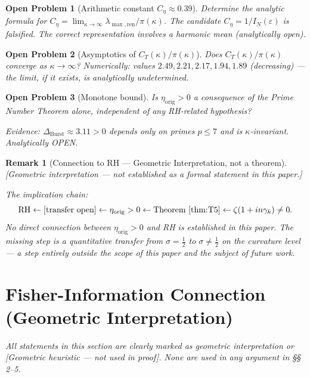 \documentclass[11pt]{article}
\newtheorem*{remark}{Remark}
\newtheorem*{openproblem}{Open Problem}
\newcommand{\etaorig}{\eta_{\mathrm{orig}}}
\newcommand{\Ceta}{C_{\eta}}
\newcommand{\CT}{C_{T}}
\newcommand{\Dburstvar}{\Delta_{\mathrm{Burst}}}
\begin{document}
\begin{openproblem}[Arithmetic constant $\Ceta\approx 0.39$]
Determine the analytic formula for
$\Ceta = \lim_{\kappa\to\infty}\lambda_{\max,\mathrm{ren}}/\pi(\kappa)$.
The candidate $\Ceta = 1/I_N(\varepsilon)$ is falsified.
The correct representation involves a harmonic mean
(analytically open).
\end{openproblem}

\begin{openproblem}[Asymptotics of $\CT(\kappa)/\pi(\kappa)$]
Does $\CT(\kappa)/\pi(\kappa)$ converge as $\kappa\to\infty$?
Numerically: values $2.49, 2.21, 2.17, 1.94, 1.89$ (decreasing) ---
the limit, if it exists, is analytically undetermined.
\end{openproblem}

\begin{openproblem}[Monotone bound]
Is $\etaorig > 0$ a consequence of the Prime Number Theorem alone,
independent of any RH-related hypothesis?

Evidence: $\Dburstvar\approx 3.11 > 0$ depends only on primes
$p\leq 7$ and is $\kappa$-invariant.
Analytically OPEN.
\end{openproblem}

\begin{remark}[Connection to RH --- Geometric Interpretation, not a theorem]
\emph{[Geometric interpretation --- not established as a formal
statement in this paper.]}

The implication chain:
\[
\mathrm{RH} \leftarrow
[\text{transfer open}]
\leftarrow \etaorig > 0
\leftarrow \text{Theorem~\ref{thm:T5}}
\leftarrow \zeta(1+in\gamma_k)\neq 0.
\]
No direct connection between $\etaorig > 0$ and RH is established
in this paper. The missing step is a quantitative transfer from
$\sigma=\tfrac{1}{2}$ to $\sigma\neq\tfrac{1}{2}$ on the curvature level
--- a step entirely outside the scope of this paper and the subject of
future work.
\end{remark}

\section{Fisher-Information Connection (Geometric Interpretation)}

\emph{All statements in this section are clearly marked as geometric
interpretation or [Geometric heuristic --- not used in proof].
None are used in any argument in \S\S\,2--5.}
\end{document}
